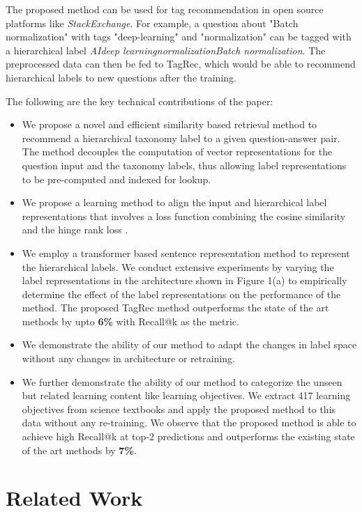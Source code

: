 \documentclass[runningheads, envcountsame, a4paper]{llncs}
\begin{document}
The proposed method can be used for tag recommendation in open source platforms like \textit{StackExchange}. For example, a question about "Batch normalization" with tags "deep-learning" and "normalization" can be tagged with a hierarchical label \textit{AIdeep learningnormalizationBatch normalization}.  The preprocessed data can then be fed to TagRec, which would be able to recommend hierarchical labels to new questions after the training.



The following are the key technical contributions of the paper:
\let\labelitemi\labelitemii
\begin{itemize}
 \setlength\itemsep{0.1em}

    \item We propose a novel and efficient similarity based retrieval method to recommend a hierarchical taxonomy label to a given question-answer pair. The method decouples the computation of vector representations for the question input and the taxonomy labels, thus allowing label representations to be pre-computed and indexed for lookup.
    \item We propose a learning method to align the input and hierarchical label representations that involves a loss function combining the cosine similarity and the hinge rank loss \cite{frome2013devise}.
    \item  We employ a transformer based sentence representation method to represent the hierarchical labels. We conduct extensive experiments by varying the label representations in the architecture shown in Figure 1(a) to empirically determine the effect of the label representations on the performance of the method. The proposed TagRec method outperforms the state of the art methods by upto \textbf{6\%} with Recall@k as the metric.
    \item We demonstrate the ability of our method to adapt the changes in label space without any changes in architecture or retraining. 
     \item We further demonstrate the ability of our method to categorize the unseen but related learning content like learning objectives. We extract 417 learning objectives from science textbooks and apply the proposed method to this data without any re-training. We observe that the proposed method is able to achieve high Recall@k at top-2 predictions and outperforms the existing state of the art methods by \textbf{7\%}.
\end{itemize}

\section{Related Work}
\end{document}
